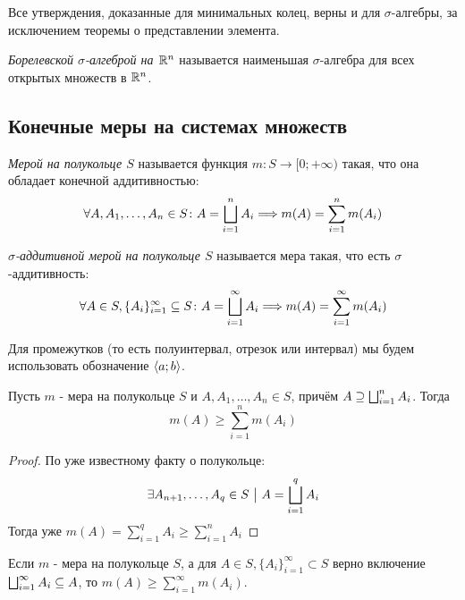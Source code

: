 \begin{note}
	Все утверждения, доказанные для минимальных колец, верны и для $\sigma$-алгебры, за исключением теоремы о представлении элемента.
\end{note}

\begin{definition}
	\textit{Борелевской $\sigma$-алгеброй на $\mathbb{R}^n$} называется наименьшая $\sigma$-алгебра для всех открытых множеств в $\mathbb{R}^n$.
\end{definition}

\subsection{Конечные меры на системах множеств}

\begin{definition}
	\textit{Мерой на полукольце $S$} называется функция $m \colon S \to [0; +\infty)$ такая, что она обладает конечной аддитивностью:
	\[
		\forall A, A_1, \ldots, A_n \in S \colon A = \bigsqcup_{i = 1}^n A_i \Longrightarrow m(A) = \sum_{i = 1}^n m(A_i)
	\]
\end{definition}

\begin{definition}
	\textit{$\sigma$-аддитивной мерой на полукольце $S$} называется мера такая, что есть $\sigma$-аддитивность:
	\[
		\forall A \in S, \{A_i\}_{i = 1}^\infty \subseteq S \colon A = \bigsqcup_{i = 1}^\infty A_i \Longrightarrow m(A) = \sum_{i = 1}^\infty m(A_i)
	\]
\end{definition}

\begin{note}
	Для промежутков (то есть полуинтервал, отрезок или интервал) мы будем использовать обозначение $\left\langle a; b\right\rangle$.
\end{note}

\begin{lemma}
	Пусть $m$ - мера на полукольце $S$ и $A, A_1, \ldots, A_n \in S$, причём $A \supseteq \bigsqcup_{i = 1}^n A_i$. Тогда
	\[
		m(A) \ge \sum_{i = 1}^n m(A_i)
	\]
\end{lemma}

\begin{proof}
	По уже известному факту о полукольце:
	\[
		\exists A_{n + 1}, \ldots, A_q \in S \ \big|\  A = \bigsqcup_{i = 1}^q A_i
	\]
	Тогда уже $m(A) = \sum_{i = 1}^q A_i \ge \sum_{i = 1}^n A_i$
\end{proof}

\begin{corollary}
	Если $m$ - мера на полукольце $S$, а для $A \in S, \{A_i\}_{i = 1}^\infty \subset S$ верно включение $\bigsqcup_{i = 1}^\infty A_i \subseteq A$, то $m(A) \ge \sum_{i = 1}^\infty m(A_i)$.
\end{corollary}

